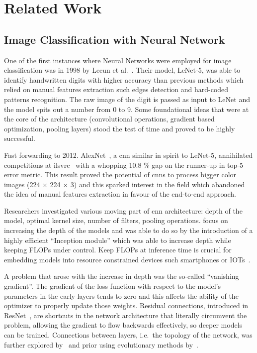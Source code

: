 \chapter{Related Work}
\label{ch:related-work}

\section{Image Classification with Neural Network}
\label{sec:image-classification-with-neural-network}

One of the first instances where Neural Networks were employed for image
classification was in 1998 by Lecun et al.~\cite{GradientBasedLecun1998}. Their
model, LeNet-5, was able to identify handwritten digits with higher accuracy
than previous methods which relied on manual features extraction such edges
detection and hard-coded patterns recognition. The raw image of the digit is
passed as input to LeNet and the model spits out a number from 0 to 9. Some
foundational ideas that were at the core of the architecture (convolutional
operations, gradient based optimization, pooling layers) stood the test of time
and proved to be highly successful.

Fast forwarding to 2012. AlexNet~\cite{ImagenetClassiKrizhe2017}, a
\acrfull{cnn} similar in spirit to LeNet-5, annihilated competitions at
\acrfull{ilsvrc}~\cite{ImagenetLargeRussak2014} with a whopping 10.8 \% gap on
the runner-up in top-5 error metric. This result proved the potential of
\acrshort{cnn}s to process bigger color images (224 × 224 × 3) and this sparked
interest in the field which abandoned the idea of manual features extraction in
favour of the end-to-end approach.

Researchers investigated various moving part of \acrshort{cnn} architecture:
depth of the model, optimal kernel size, number of filters, pooling operations.
\cite{VeryDeepConvoSimony2014,GoingDeeperWiSzeged2014} focus on increasing the
depth of the models and \cite{GoingDeeperWiSzeged2014} was able to do so by the
introduction of a highly efficient ``Inception module'' which was able to
increase depth while keeping FLOPs under control. Keep FLOPs at inference time
is crucial for embedding models into resource constrained devices such
smartphones or IOTs~\cite{SqueezenetAleIandol2016, MnasnetPlatfoTanM2018,
MobilenetsEffHoward2017}.

A problem that arose with the increase in depth was the so-called ``vanishing
gradient''. The gradient of the loss function with respect to the model's
parameters in the early layers tends to zero and this affects the ability of the
optimizer to properly update those weights. Residual connections, introduced in
ResNet~\cite{DeepResidualLHeKa2015, IdentityMappinHeKa2016}, are shortcuts in
the network architecture that literally circumvent the problem, allowing the
gradient to flow backwards effectively, so deeper models can be trained.
Connections between layers, i.e.\ the topology of the network, was further
explored by~\cite{DualPathNetwoChen2017, DenselyConnectHuang2016} and prior
using evolutionary methods by~\cite{DesigningNeuraMiller1989,
EvolvingNeuralStanle2002}.

